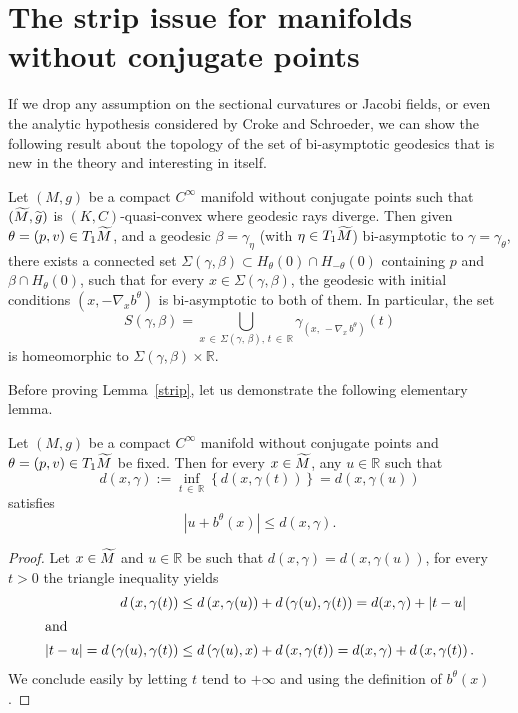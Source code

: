 \documentclass[AHL,Unicode,longabstracts,published]{cedram}
\newcommand{\bbR}{\mathbb{R}}
\let\oldtilde\tilde
\renewcommand*{\tilde}[1]{\mathchoice{\widetilde{#1}}{\widetilde{#1}}{\oldtilde{#1}}{\oldtilde{#1}}}
\begin{document}
\section{The strip issue for manifolds without conjugate points}\label{SECstrip}

If we drop any assumption on the sectional curvatures or Jacobi fields, or even the analytic hypothesis considered by Croke and Schroeder, we can show the following result about the topology of the set of bi-asymptotic geodesics that is new in the theory and interesting in itself.

\begin{lemm}\label{strip}
Let $(M,g)$ be a compact $C^{\infty}$ manifold without conjugate points such that $(\tilde{M}, \tilde{g})$ is $(K,C)$-quasi-convex where geodesic rays diverge. Then given $\theta = (p,v) \in T_{1}\tilde{M}$, and a geodesic $\beta=\gamma_{\eta}$ (with $\eta \in T_{1}\tilde{M}$) bi-asymptotic to $\gamma = \gamma_{\theta}$, there exists a connected set $\Sigma(\gamma, \beta) \subset H_{\theta}(0) \cap H_{-\theta}(0)$ containing $p$ and $\beta \cap H_{\theta}(0)$, such that for every $x \in \Sigma(\gamma, \beta)$, the geodesic with initial conditions $(x, -\nabla_{x} b^{\theta})$ is bi-asymptotic to both of them. In particular, the set
\[
S(\gamma, \beta) = \bigcup_{x\,\in\,\Sigma(\gamma,\,\beta),\,t\, \in\,\bbR} \gamma_{\left(x,\,-\nabla_{x}\,b^{\theta}\right)}(t)
\]
is homeomorphic to $\Sigma(\gamma, \beta) \times \bbR$.
\end{lemm}

Before proving Lemma~\ref{strip}, let us demonstrate the following elementary lemma.

\begin{lemm}\label{lemLR}
Let $(M,g)$ be a compact $C^{\infty}$ manifold without conjugate points and $\theta = (p,v) \in T_{1}\tilde{M}$ be fixed. Then for every $x\in \tilde{M}$, any $u\in \bbR$ such that
\[
d(x,\gamma) := \inf_{t\,\in\,\bbR} \left\{d \left(x,\gamma(t) \right) \right\} = d(x,\gamma(u))
\]
satisfies
\[
\left| u + b^{\theta}(x)\right| \leq d(x,\gamma).
\]
\end{lemm}

\begin{proof}
Let $x\in \tilde{M}$ and $u\in \bbR $ be such that $d(x,\gamma) =d(x,\gamma(u))$, for every $t>0$ the triangle inequality yields
\begin{align*}
d\left(x,\gamma(t) \right) &\leq d\left(x,\gamma(u)\right) + d\left(\gamma(u),\gamma(t)\right) = d(x,\gamma) + |t-u|\\
\intertext{and}
|t-u| = d\left(\gamma(u),\gamma(t) \right) &\leq d\left(\gamma(u),x\right) + d\left(x,\gamma(t)\right) = d(x,\gamma) + d\left(x,\gamma(t)\right).
\end{align*}
We conclude easily by letting $t$ tend to $+\infty$ and using the definition of $b^{\theta}(x)$.
\end{proof}
\end{document}
